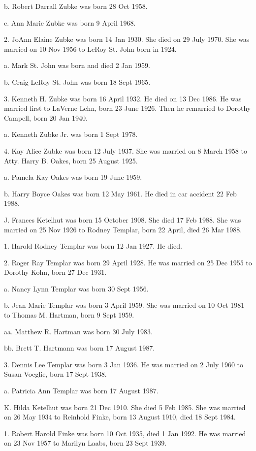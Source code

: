 \documentclass[a4paper]{article}
\begin{document}
b.  Robert Darrall Zubke was born 28 Oct 1958.  

c. Ann Marie Zubke was born 9 April 1968.

2. JoAnn Elaine Zubke was born 14 Jan 1930.  She died on 29 July 1970.  She was married on 10 Nov 1956 to LeRoy St. John born in 1924.

a. Mark St. John was born and died 2 Jan 1959.

b. Craig LeRoy St. John was born 18 Sept 1965.

3. Kenneth H. Zubke was born 16 April 1932.  He died on 13 Dec 1986.  He was married first to LaVerne Lehn, born 23 June 1926.  Then he remarried to Dorothy Campell, born 20 Jan 1940.  

a. Kenneth Zubke Jr. was born 1 Sept 1978.

4. Kay Alice Zubke was born 12 July 1937.  She was married on 8 March 1958 to Atty. Harry B. Oakes, born 25 August 1925. 

a. Pamela Kay Oakes was born 19 June 1959.

b. Harry Boyce Oakes was born 12 May 1961.  He died in car accident 22 Feb 1988.

J. Frances Ketelhut was born 15 October 1908.  She died 17 Feb 1988.  She was married on 25 Nov 1926 to Rodney Templar, born 22 April, died 26 Mar 1988.

1. Harold Rodney Templar was born 12 Jan 1927.  He died.

2. Roger Ray Templar was born 29 April 1928.  He was married on 25 Dec 1955 to Dorothy Kohn, born 27 Dec 1931.

a. Nancy Lynn Templar was born 30 Sept 1956.

b. Jean Marie Templar was born 3 April 1959.  She was married on 10 Oct 1981 to Thomas M. Hartman, born 9 Sept 1959.

aa. Matthew R. Hartman was born 30 July 1983.

bb. Brett T. Hartmann was born 17 August 1987.

3. Dennis Lee Templar was born 3 Jan 1936.  He was married on 2 July 1960 to Susan Voeglie, born 17 Sept 1938.

a. Patricia Ann Templar was born 17 August 1987.

K. Hilda Ketelhut was born 21 Dec 1910.  She died 5 Feb 1985.  She was married on 26 May 1934 to Reinhold Finke, born 13 August 1910, died 18 Sept 1984.

1. Robert Harold Finke was born 10 Oct 1935, died 1 Jan 1992.  He was married on 23 Nov 1957 to Marilyn Laabs, born 23 Sept 1939.
\end{document}
